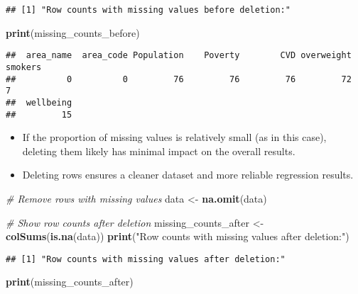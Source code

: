 \documentclass[
]{article}
\newenvironment{Shaded}{\begin{snugshade}}{\end{snugshade}}
\newcommand{\CommentTok}[1]{\textcolor[rgb]{0.56,0.35,0.01}{\textit{#1}}}
\newcommand{\FunctionTok}[1]{\textcolor[rgb]{0.13,0.29,0.53}{\textbf{#1}}}
\newcommand{\NormalTok}[1]{#1}
\newcommand{\OtherTok}[1]{\textcolor[rgb]{0.56,0.35,0.01}{#1}}
\newcommand{\StringTok}[1]{\textcolor[rgb]{0.31,0.60,0.02}{#1}}
\providecommand{\tightlist}{%
  \setlength{\itemsep}{0pt}\setlength{\parskip}{0pt}}
\begin{document}
\begin{verbatim}
## [1] "Row counts with missing values before deletion:"
\end{verbatim}

\begin{Shaded}
\begin{Highlighting}[]
\FunctionTok{print}\NormalTok{(missing\_counts\_before)}
\end{Highlighting}
\end{Shaded}

\begin{verbatim}
##  area_name  area_code Population    Poverty        CVD overweight    smokers 
##          0          0         76         76         76         72          7 
##  wellbeing 
##         15
\end{verbatim}

\begin{itemize}
\tightlist
\item
  If the proportion of missing values is relatively small (as in this
  case), deleting them likely has minimal impact on the overall results.
\item
  Deleting rows ensures a cleaner dataset and more reliable regression
  results.
\end{itemize}

\begin{Shaded}
\begin{Highlighting}[]
\CommentTok{\# Remove rows with missing values}
\NormalTok{data }\OtherTok{\textless{}{-}} \FunctionTok{na.omit}\NormalTok{(data)}

\CommentTok{\# Show row counts after deletion}
\NormalTok{missing\_counts\_after }\OtherTok{\textless{}{-}} \FunctionTok{colSums}\NormalTok{(}\FunctionTok{is.na}\NormalTok{(data))}
\FunctionTok{print}\NormalTok{(}\StringTok{"Row counts with missing values after deletion:"}\NormalTok{)}
\end{Highlighting}
\end{Shaded}

\begin{verbatim}
## [1] "Row counts with missing values after deletion:"
\end{verbatim}

\begin{Shaded}
\begin{Highlighting}[]
\FunctionTok{print}\NormalTok{(missing\_counts\_after)}
\end{Highlighting}
\end{Shaded}
\end{document}
